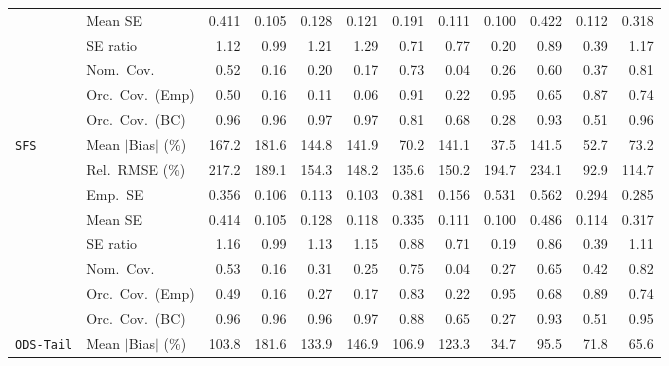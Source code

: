 \begin{landscape}
\begin{longtable}{llrrrrrrrrrr}
 & Mean SE & 0.411 & 0.105 & 0.128 & 0.121 & 0.191 & 0.111 & 0.100 & 0.422 & 0.112 & 0.318 \\
 & SE ratio & \cellcolor{rankthree}1.12 & \cellcolor{rankone}0.99 & 1.21 & 1.29 & 0.71 & 0.77 & 0.20 & \cellcolor{ranktwo}0.89 & 0.39 & 1.17 \\
 & Nom.\ Cov. & 0.52 & 0.16 & 0.20 & 0.17 & \cellcolor{ranktwo}0.73 & 0.04 & 0.26 & \cellcolor{rankthree}0.60 & 0.37 & \cellcolor{rankone}0.81 \\
 & Orc.\ Cov.\ (Emp) & 0.50 & 0.16 & 0.11 & 0.06 & \cellcolor{ranktwo}0.91 & 0.22 & \cellcolor{rankone}0.95 & 0.65 & \cellcolor{rankthree}0.87 & 0.74 \\
 & Orc.\ Cov.\ (BC) & \cellcolor{rankone}0.96 & \cellcolor{rankone}0.96 & \cellcolor{ranktwo}0.97 & \cellcolor{ranktwo}0.97 & \cellcolor{rankthree}0.81 & 0.68 & 0.28 & \cellcolor{ranktwo}0.93 & 0.51 & \cellcolor{rankone}0.96 \\
\addlinespace[2pt]
\quad \texttt{SFS} & Mean $|$Bias$|$ (\%) & 167.2 & 181.6 & 144.8 & 141.9 & \cellcolor{rankthree}70.2 & 141.1 & \cellcolor{rankone}37.5 & 141.5 & \cellcolor{ranktwo}52.7 & 73.2 \\
 & Rel.\ RMSE (\%) & 217.2 & 189.1 & 154.3 & 148.2 & \cellcolor{rankthree}135.6 & 150.2 & 194.7 & 234.1 & \cellcolor{rankone}92.9 & \cellcolor{ranktwo}114.7 \\
 & Emp.\ SE & 0.356 & 0.106 & 0.113 & 0.103 & 0.381 & 0.156 & 0.531 & 0.562 & 0.294 & 0.285 \\
 & Mean SE & 0.414 & 0.105 & 0.128 & 0.118 & 0.335 & 0.111 & 0.100 & 0.486 & 0.114 & 0.317 \\
 & SE ratio & 1.16 & \cellcolor{rankone}0.99 & 1.13 & 1.15 & \cellcolor{rankthree}0.88 & 0.71 & 0.19 & 0.86 & 0.39 & \cellcolor{ranktwo}1.11 \\
 & Nom.\ Cov. & 0.53 & 0.16 & 0.31 & 0.25 & \cellcolor{ranktwo}0.75 & 0.04 & 0.27 & \cellcolor{rankthree}0.65 & 0.42 & \cellcolor{rankone}0.82 \\
 & Orc.\ Cov.\ (Emp) & 0.49 & 0.16 & 0.27 & 0.17 & \cellcolor{rankthree}0.83 & 0.22 & \cellcolor{rankone}0.95 & 0.68 & \cellcolor{ranktwo}0.89 & 0.74 \\
 & Orc.\ Cov.\ (BC) & \cellcolor{ranktwo}0.96 & \cellcolor{ranktwo}0.96 & \cellcolor{ranktwo}0.96 & \cellcolor{rankthree}0.97 & 0.88 & 0.65 & 0.27 & \cellcolor{rankthree}0.93 & 0.51 & \cellcolor{rankone}0.95 \\
\addlinespace[2pt]
\quad \texttt{ODS-Tail} & Mean $|$Bias$|$ (\%) & 103.8 & 181.6 & 133.9 & 146.9 & 106.9 & 123.3 & \cellcolor{rankone}34.7 & 95.5 & \cellcolor{rankthree}71.8 & \cellcolor{ranktwo}65.6 \\

\end{longtable}
\end{landscape}
